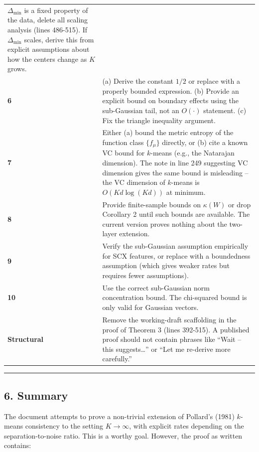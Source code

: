 \documentclass[
  12pt,
]{ctexart}
\begin{document}
\begin{longtable}[]{@{}
  >{\raggedright\arraybackslash}p{}
  >{\raggedright\arraybackslash}p{}@{}}
\(\Delta_{\min}\) is a fixed property of the data, delete all scaling
analysis (lines 486-515). If \(\Delta_{\min}\) scales, derive this from
explicit assumptions about how the centers change as \(K\) grows. \\
\textbf{6} & (a) Derive the constant \(1/2\) or replace with a properly
bounded expression. (b) Provide an explicit bound on boundary effects
using the sub-Gaussian tail, not an \(O(\cdot)\) statement. (c) Fix the
triangle inequality argument. \\
\textbf{7} & Either (a) bound the metric entropy of the function class
\(\{f_\mu\}\) directly, or (b) cite a known VC bound for \(k\)-means
(e.g., the Natarajan dimension). The note in line 249 suggesting VC
dimension gives the same bound is misleading -- the VC dimension of
\(k\)-means is \(O(K d \log(K d))\) at minimum. \\
\textbf{8} & Provide finite-sample bounds on \(\kappa(W)\) or drop
Corollary 2 until such bounds are available. The current version proves
nothing about the two-layer extension. \\
\textbf{9} & Verify the sub-Gaussian assumption empirically for SCX
features, or replace with a boundedness assumption (which gives weaker
rates but requires fewer assumptions). \\
\textbf{10} & Use the correct sub-Gaussian norm concentration bound. The
chi-squared bound is only valid for Gaussian vectors. \\
\textbf{Structural} & Remove the working-draft scaffolding in the proof
of Theorem 3 (lines 392-515). A published proof should not contain
phrases like ``Wait -- this suggests\ldots{}'' or ``Let me re-derive
more carefully.'' \\
\end{longtable}

\begin{center}\rule{0.5\linewidth}{0.5pt}\end{center}

\subsection{6. Summary}\label{summary}

The document attempts to prove a non-trivial extension of Pollard's
(1981) \(k\)-means consistency to the setting \(K \to \infty\), with
explicit rates depending on the separation-to-noise ratio. This is a
worthy goal. However, the proof as written contains:
\end{document}
